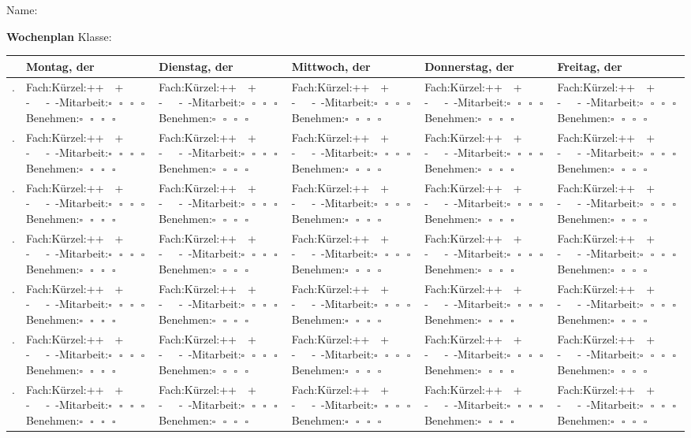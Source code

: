 \documentclass [a4paper,landscape,11pt] {extarticle}
\newcounter{stunde}
\newcommand{\cellContent}{Fach:\hspace{1.2cm}Kürzel:\vspace{2mm}\newline\hspace*{\fill}++~~+~~~~-~~~-~-\newline Mitarbeit:\hfill$\square~~~\square~~~\square~~~\square$\newline Benehmen:\hfill$\square~~~\square~~~\square~~~\square$ }
\newcommand{\tablerow}{\hline\stepcounter{stunde}\newline\arabic{stunde}.&\cellContent&\cellContent&\cellContent&\cellContent&\cellContent\\}
\begin{document}
\begin{center}
Name:~\colorbox{shadecolor}{\hspace{4cm}\strut}
\hfill {\Large\bfseries Wochenplan}
\hfill Klasse:~\colorbox{shadecolor}{\hspace{1cm}\strut} 
\par\medskip

\begin{tabularx}{\textwidth}{|c| X | X | X | X | X |}
\hline
& {\large\bfseries Montag}, der & {\large\bfseries Dienstag}, der & {\large\bfseries Mittwoch}, der & {\large\bfseries Donnerstag}, der & {\large\bfseries Freitag}, der\\
\tablerow
\hline
\tablerow
\hline
\tablerow
\hline
\tablerow
\hline
\tablerow
\hline
\tablerow
\hline
\tablerow
\hline
\end{tabularx}



\end{center}%
\end{document}
